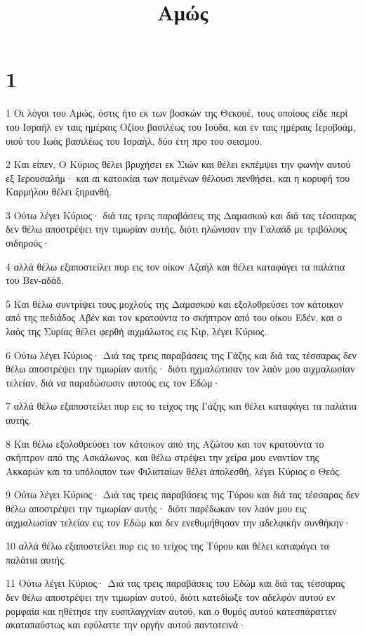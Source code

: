 

\title{Αμώς}


\chapter{1}

\par 1 Οι λόγοι του Αμώς, όστις ήτο εκ των βοσκών της Θεκουέ, τους οποίους είδε περί του Ισραήλ εν ταις ημέραις Οζίου βασιλέως του Ιούδα, και εν ταις ημέραις Ιεροβοάμ, υιού του Ιωάς βασιλέως του Ισραήλ, δύο έτη προ του σεισμού.
\par 2 Και είπεν, Ο Κύριος θέλει βρυχήσει εκ Σιών και θέλει εκπέμψει την φωνήν αυτού εξ Ιερουσαλήμ· και αι κατοικίαι των ποιμένων θέλουσι πενθήσει, και η κορυφή του Καρμήλου θέλει ξηρανθή.
\par 3 Ούτω λέγει Κύριος· διά τας τρεις παραβάσεις της Δαμασκού και διά τας τέσσαρας δεν θέλω αποστρέψει την τιμωρίαν αυτής, διότι ηλώνισαν την Γαλαάδ με τριβόλους σιδηρούς·
\par 4 αλλά θέλω εξαποστείλει πυρ εις τον οίκον Αζαήλ και θέλει καταφάγει τα παλάτια του Βεν-αδάδ.
\par 5 Και θέλω συντρίψει τους μοχλούς της Δαμασκού και εξολοθρεύσει τον κάτοικον από της πεδιάδος Αβέν και τον κρατούντα το σκήπτρον από του οίκου Εδέν, και ο λαός της Συρίας θέλει φερθή αιχμάλωτος εις Κιρ, λέγει Κύριος.
\par 6 Ούτω λέγει Κύριος· Διά τας τρεις παραβάσεις της Γάζης και διά τας τέσσαρας δεν θέλω αποστρέψει την τιμωρίαν αυτής· διότι ηχμαλώτισαν τον λαόν μου αιχμαλωσίαν τελείαν, διά να παραδώσωσιν αυτούς εις τον Εδώμ·
\par 7 αλλά θέλω εξαποστείλει πυρ εις το τείχος της Γάζης και θέλει καταφάγει τα παλάτια αυτής.
\par 8 Και θέλω εξολοθρεύσει τον κάτοικον από της Αζώτου και τον κρατούντα το σκήπτρον από της Ασκάλωνος, και θέλω στρέψει την χείρα μου εναντίον της Ακκαρών και το υπόλοιπον των Φιλισταίων θέλει απολεσθή, λέγει Κύριος ο Θεός.
\par 9 Ούτω λέγει Κύριος· Διά τας τρεις παραβάσεις της Τύρου και διά τας τέσσαρας δεν θέλω αποστρέψει την τιμωρίαν αυτής· διότι παρέδωκαν τον λαόν μου εις αιχμαλωσίαν τελείαν εις τον Εδώμ και δεν ενεθυμήθησαν την αδελφικήν συνθήκην·
\par 10 αλλά θέλω εξαποστείλει πυρ εις το τείχος της Τύρου και θέλει καταφάγει τα παλάτια αυτής.
\par 11 Ούτω λέγει Κύριος· Διά τας τρεις παραβάσεις του Εδώμ και διά τας τέσσαρας δεν θέλω αποστρέψει την τιμωρίαν αυτού, διότι κατεδίωξε τον αδελφόν αυτού εν ρομφαία και ηθέτησε την ευσπλαγχνίαν αυτού, και ο θυμός αυτού κατεσπάραττεν ακαταπαύστως και εφύλαττε την οργήν αυτού παντοτεινά·

